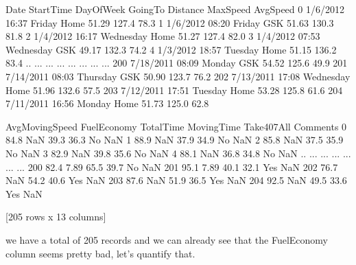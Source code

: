 \documentclass[letterpaper,10pt,english]{jupyterBook}
\begin{document}
\begin{sphinxVerbatim}[commandchars=\\\{\}]
          Date StartTime  DayOfWeek GoingTo  Distance  MaxSpeed  AvgSpeed  \PYGZbs{}
0     1/6/2012     16:37     Friday    Home     51.29     127.4      78.3   
1     1/6/2012     08:20     Friday     GSK     51.63     130.3      81.8   
2     1/4/2012     16:17  Wednesday    Home     51.27     127.4      82.0   
3     1/4/2012     07:53  Wednesday     GSK     49.17     132.3      74.2   
4     1/3/2012     18:57    Tuesday    Home     51.15     136.2      83.4   
..         ...       ...        ...     ...       ...       ...       ...   
200  7/18/2011     08:09     Monday     GSK     54.52     125.6      49.9   
201  7/14/2011     08:03   Thursday     GSK     50.90     123.7      76.2   
202  7/13/2011     17:08  Wednesday    Home     51.96     132.6      57.5   
203  7/12/2011     17:51    Tuesday    Home     53.28     125.8      61.6   
204  7/11/2011     16:56     Monday    Home     51.73     125.0      62.8   

     AvgMovingSpeed FuelEconomy  TotalTime  MovingTime Take407All Comments  
0              84.8         NaN       39.3        36.3         No      NaN  
1              88.9         NaN       37.9        34.9         No      NaN  
2              85.8         NaN       37.5        35.9         No      NaN  
3              82.9         NaN       39.8        35.6         No      NaN  
4              88.1         NaN       36.8        34.8         No      NaN  
..              ...         ...        ...         ...        ...      ...  
200            82.4        7.89       65.5        39.7         No      NaN  
201            95.1        7.89       40.1        32.1        Yes      NaN  
202            76.7         NaN       54.2        40.6        Yes      NaN  
203            87.6         NaN       51.9        36.5        Yes      NaN  
204            92.5         NaN       49.5        33.6        Yes      NaN  

[205 rows x 13 columns]
\end{sphinxVerbatim}

\sphinxAtStartPar
we have a total of 205 records and we can already see that the FuelEconomy column seems pretty bad, let’s quantify that.

\begin{sphinxVerbatim}[commandchars=\\\{\}]
\end{sphinxVerbatim}
\end{document}
